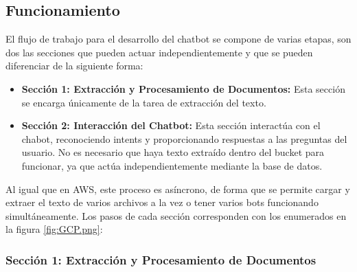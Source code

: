 \subsection{Funcionamiento}\label{funcionamiento-gcp}
El flujo de trabajo para el desarrollo del chatbot se compone de varias etapas, son dos las secciones que pueden actuar independientemente y que se pueden diferenciar de la siguiente forma:  

\begin{itemize}
    \item \textbf{Sección 1: Extracción y Procesamiento de Documentos:} Esta sección se encarga únicamente de la tarea de extracción del texto.
    \item \textbf{Sección 2: Interacción del Chatbot:} Esta sección interactúa con el chabot, reconociendo intents y proporcionando respuestas a las preguntas del usuario. No es necesario que haya texto extraído dentro del bucket para funcionar, ya que actúa independientemente mediante la base de datos. 
\end{itemize}
Al igual que en AWS, este proceso es asíncrono, de forma que se permite cargar y extraer el texto de varios archivos a la vez o tener varios bots funcionando simultáneamente. Los pasos de cada sección corresponden con los enumerados en la figura \ref{fig:GCP.png}:

\subsubsection{Sección 1: Extracción y Procesamiento de Documentos}

